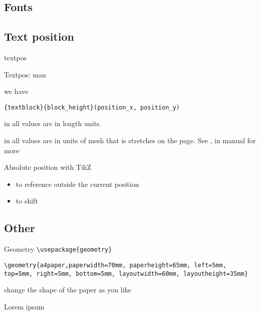 \graphicspath{{sec02/images/}{sec02/code/}}
\lstset{inputpath=sec02/code/}

\subsection{Fonts}


\subsection{Text position}

\begin{frame}[fragile]{textpos\magicPage}\relax
\cprotect{}
     
\end{frame}

\begin{frame}[fragile]{Textpos: man\magicPage}\relax

we have

\verb|{textblock}{block_height}(position_x, position_y)|

in  all values are in length units.

in  all values are in units of mesh that is stretches on the page. See \ccol{\TPoptions}, \ccol{\TPGrid} in manual for more
\end{frame}

\begin{frame}[fragile]{Absolute position with TikZ\magicPage}\relax
\cprotect{}
\begin{itemize}
\item {} to reference outside the current position
\item {} to shift
\end{itemize}

\end{frame}

\subsection{Other}
\begin{frame}[fragile]{Geometry\magicPage}\relax
     \lstinline[basicstyle=\tt]|\usepackage{geometry}|
     
\lstinline[basicstyle=\tt]|\geometry{a4paper,paperwidth=70mm, paperheight=65mm, left=5mm, top=5mm, right=5mm, bottom=5mm, layoutwidth=60mm, layoutheight=35mm}|
     
     change the shape of the paper as you like
\end{frame}

\begin{frame}[fragile]{Lorem ipsum\magicPage}\relax
\cprotect{}
     
\end{frame}
